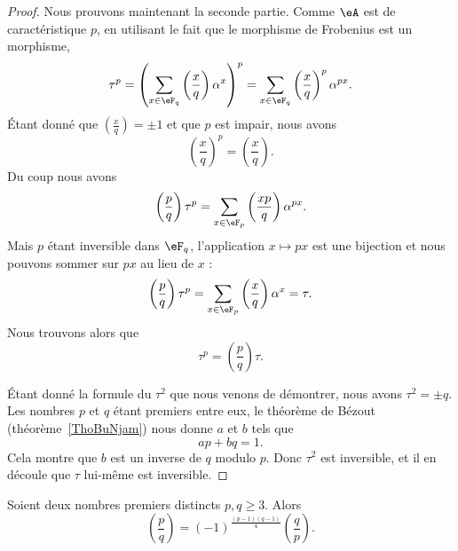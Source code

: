 \begin{proof}
	Nous prouvons maintenant la seconde partie. Comme \( \eA\) est de caractéristique \( p\), en utilisant le fait que le morphisme de Frobenius est un morphisme,
	\begin{equation}
		\tau^p=\left( \sum_{x\in \eF_q}\left(\frac{x}{q}\right)\alpha^x \right)^p=\sum_{x\in \eF_q}\left(\frac{x}{q}\right)^p\alpha^{px}.
	\end{equation}
	Étant donné que \( \left(\frac{x}{q}\right)=\pm 1\) et que \( p\) est impair, nous avons
	\begin{equation}
		\left(\frac{x}{q}\right)^p=\left(\frac{x}{q}\right).
	\end{equation}
	Du coup nous avons
	\begin{equation}
		\left(\frac{p}{q}\right)\tau^p=\sum_{x\in \eF_p}\left(\frac{xp}{q}\right)\alpha^{px}.
	\end{equation}
	Mais \( p\) étant inversible dans \( \eF_q\), l'application \( x\mapsto px\) est une bijection et nous pouvons sommer sur \( px\) au lieu de \( x\) :
	\begin{equation}
		\left(\frac{p}{q}\right)\tau^p=\sum_{x\in \eF_p}\left(\frac{x}{q}\right)\alpha^x=\tau.
	\end{equation}
	Nous trouvons alors que
	\begin{equation}
		\tau^p=\left(\frac{p}{q}\right)\tau.
	\end{equation}

	Étant donné la formule du \( \tau^2\) que nous venons de démontrer, nous avons \( \tau^2=\pm q\). Les nombres \( p\) et \( q\) étant premiers entre eux, le théorème de Bézout (théorème~\ref{ThoBuNjam}) nous donne \( a\) et \( b\) tels que
	\begin{equation}
		ap+bq=1.
	\end{equation}
	Cela montre que \( b\) est un inverse de \( q\) modulo \( p\). Donc \( \tau^2\) est inversible, et il en découle que \( \tau\) lui-même est inversible.
\end{proof}

\begin{theorem}  \label{ThoMiEiUm}
	Soient deux nombres premiers distincts \( p,q\geq 3\). Alors
	\begin{equation}
		\left(\frac{p}{q}\right)=(-1)^{\frac{ (p-1)(q-1) }{ 4 }}\left(\frac{q}{p}\right).
	\end{equation}
\end{theorem}


